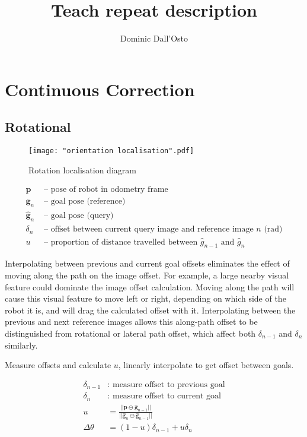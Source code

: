 \documentclass{article}
\title{Teach repeat description}
\author{Dominic Dall'Osto}
\begin{document}
\maketitle

\section{Continuous Correction}

\subsection{Rotational}

\begin{figure}[ht]
	\centering
	\texttt{[image: "orientation localisation".pdf]}
	\caption{Rotation localisation diagram}
\end{figure}

\begin{align*}
	\boldsymbol{p} & \text{ -- pose of robot in odometry frame} \\
	\boldsymbol{g}_n & \text{ -- goal pose (reference)} \\
	\boldsymbol{\hat g}_n & \text{ -- goal pose (query)} \\
	\delta_n & \text{ -- offset between current query image and reference image } n \text{ (rad)}\\
	u & \text{ -- proportion of distance travelled between } \hat g_{n-1} \text{ and } \hat g_n
\end{align*}

Interpolating between previous and current goal offsets eliminates the effect of moving along the path on the image offset. For example, a large nearby visual feature could dominate the image offset calculation. Moving along the path will cause this visual feature to move left or right, depending on which side of the robot it is, and will drag the calculated offset with it. Interpolating between the previous and next reference images allows this along-path offset to be distinguished from rotational or lateral path offset, which affect both $\delta_{n-1}$ and $\delta_n$ similarly.

Measure offsets and calculate $u$, linearly interpolate to get offset between goals.

\begin{align*}
	\delta_{n-1} &: \text{ measure offset to previous goal} \\
	\delta_n &: \text{ measure offset to current goal} \\
	u &= \frac{||\boldsymbol{p} \ominus \boldsymbol{\hat g}_{n-1}||}{||\boldsymbol{\hat g}_n \ominus \boldsymbol{\hat g}_{n-1}||} \\
	\Delta\theta &= (1-u)\delta_{n-1} + u\delta_n
\end{align*}
\end{document}
